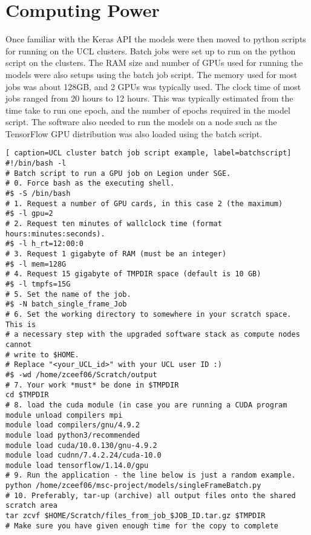 \section{Computing Power}
Once familiar with the Keras API the models were then moved to python scripts for running on the UCL clusters. 
Batch jobs were set up to run on the python script on the clusters. 
The RAM size and number of GPUs used for running the models were also setups using the batch job script.  The memory used for most jobs was about 128GB, and 2 GPUs was typically used.  The clock time of most jobs ranged from 20 hours to 12 hours. This was typically estimated from the time take to run one epoch, and the number of epochs required in the model script. The software also needed to run the models on a node such as the TensorFlow GPU distribution was also loaded using the batch script. 

\begin{lstlisting}[ caption=UCL cluster batch job script example, label=batchscript]
#!/bin/bash -l
# Batch script to run a GPU job on Legion under SGE.
# 0. Force bash as the executing shell.
#$ -S /bin/bash
# 1. Request a number of GPU cards, in this case 2 (the maximum)
#$ -l gpu=2
# 2. Request ten minutes of wallclock time (format hours:minutes:seconds).
#$ -l h_rt=12:00:0
# 3. Request 1 gigabyte of RAM (must be an integer)
#$ -l mem=128G
# 4. Request 15 gigabyte of TMPDIR space (default is 10 GB)
#$ -l tmpfs=15G
# 5. Set the name of the job.
#$ -N batch_single_frame_Job
# 6. Set the working directory to somewhere in your scratch space. This is
# a necessary step with the upgraded software stack as compute nodes cannot
# write to $HOME.
# Replace "<your_UCL_id>" with your UCL user ID :)
#$ -wd /home/zceef06/Scratch/output
# 7. Your work *must* be done in $TMPDIR
cd $TMPDIR
# 8. load the cuda module (in case you are running a CUDA program
module unload compilers mpi
module load compilers/gnu/4.9.2
module load python3/recommended
module load cuda/10.0.130/gnu-4.9.2
module load cudnn/7.4.2.24/cuda-10.0
module load tensorflow/1.14.0/gpu
# 9. Run the application - the line below is just a random example.
python /home/zceef06/msc-project/models/singleFrameBatch.py
# 10. Preferably, tar-up (archive) all output files onto the shared scratch area
tar zcvf $HOME/Scratch/files_from_job_$JOB_ID.tar.gz $TMPDIR
# Make sure you have given enough time for the copy to complete
\end{lstlisting}


